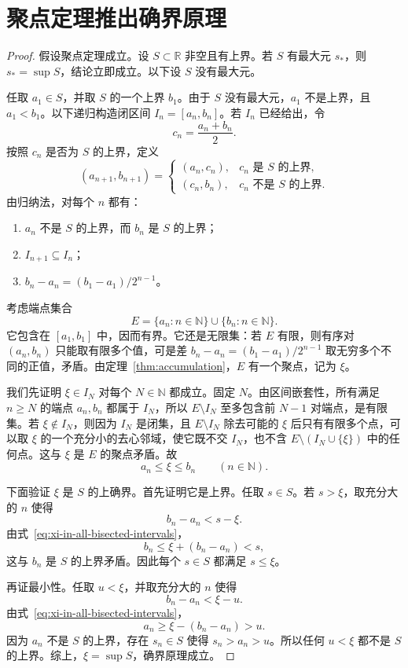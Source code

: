 \documentclass[UTF8,12pt,a4paper,fontset=fandol,oneside]{ctexart}
\begin{document}
\section{聚点定理推出确界原理}

\begin{proof}
  假设聚点定理成立。设 $S\subset\mathbb R$ 非空且有上界。若 $S$ 有最大元 $s_*$，则 $s_*=\sup S$，结论立即成立。以下设 $S$ 没有最大元。

  任取 $a_1\in S$，并取 $S$ 的一个上界 $b_1$。由于 $S$ 没有最大元，$a_1$ 不是上界，且 $a_1<b_1$。以下递归构造闭区间 $I_n=[a_n,b_n]$。若 $I_n$ 已经给出，令
  \[
    c_n=\frac{a_n+b_n}{2}.
  \]
  按照 $c_n$ 是否为 $S$ 的上界，定义
  \begin{equation}
    (a_{n+1},b_{n+1})=
    \begin{cases}
      (a_n,c_n), & c_n\text{ 是 }S\text{ 的上界},\\
      (c_n,b_n), & c_n\text{ 不是 }S\text{ 的上界}.
    \end{cases}
    \label{eq:sup-bisection}
  \end{equation}
  由归纳法，对每个 $n$ 都有：
  \begin{enumerate}
    \item $a_n$ 不是 $S$ 的上界，而 $b_n$ 是 $S$ 的上界；
    \item $I_{n+1}\subseteq I_n$；
    \item $b_n-a_n=(b_1-a_1)/2^{n-1}$。
  \end{enumerate}

  考虑端点集合
  \[
    E=\{a_n:n\in\mathbb N\}\cup\{b_n:n\in\mathbb N\}.
  \]
  它包含在 $[a_1,b_1]$ 中，因而有界。它还是无限集：若 $E$ 有限，则有序对 $(a_n,b_n)$ 只能取有限多个值，可是差 $b_n-a_n=(b_1-a_1)/2^{n-1}$ 取无穷多个不同的正值，矛盾。由定理~\ref{thm:accumulation}，$E$ 有一个聚点，记为 $\xi$。

  我们先证明 $\xi\in I_N$ 对每个 $N\in\mathbb N$ 都成立。固定 $N$。由区间嵌套性，所有满足 $n\geq N$ 的端点 $a_n,b_n$ 都属于 $I_N$，所以 $E\setminus I_N$ 至多包含前 $N-1$ 对端点，是有限集。若 $\xi\notin I_N$，则因为 $I_N$ 是闭集，且 $E\setminus I_N$ 除去可能的 $\xi$ 后只有有限多个点，可以取 $\xi$ 的一个充分小的去心邻域，使它既不交 $I_N$，也不含 $E\setminus(I_N\cup\{\xi\})$ 中的任何点。这与 $\xi$ 是 $E$ 的聚点矛盾。故
  \begin{equation}
    a_n\leq\xi\leq b_n\qquad(n\in\mathbb N).
    \label{eq:xi-in-all-bisected-intervals}
  \end{equation}

  下面验证 $\xi$ 是 $S$ 的上确界。首先证明它是上界。任取 $s\in S$。若 $s>\xi$，取充分大的 $n$ 使得
  \[
    b_n-a_n<s-\xi.
  \]
  由式~\eqref{eq:xi-in-all-bisected-intervals}，
  \[
    b_n\leq\xi+(b_n-a_n)<s,
  \]
  这与 $b_n$ 是 $S$ 的上界矛盾。因此每个 $s\in S$ 都满足 $s\leq\xi$。

  再证最小性。任取 $u<\xi$，并取充分大的 $n$ 使得
  \[
    b_n-a_n<\xi-u.
  \]
  由式~\eqref{eq:xi-in-all-bisected-intervals}，
  \[
    a_n\geq\xi-(b_n-a_n)>u.
  \]
  因为 $a_n$ 不是 $S$ 的上界，存在 $s_n\in S$ 使得 $s_n>a_n>u$。所以任何 $u<\xi$ 都不是 $S$ 的上界。综上，$\xi=\sup S$，确界原理成立。
\end{proof}
\end{document}
